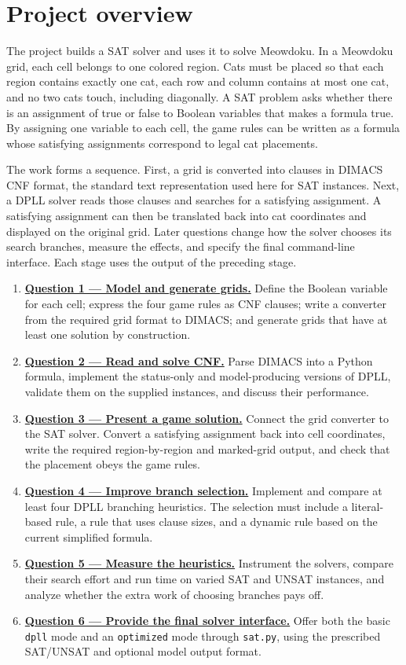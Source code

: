 \section*{Project overview}

The project builds a SAT solver and uses it to solve Meowdoku. In a Meowdoku grid, each cell belongs to one colored region. Cats must be placed so that each region contains exactly one cat, each row and column contains at most one cat, and no two cats touch, including diagonally. A SAT problem asks whether there is an assignment of true or false to Boolean variables that makes a formula true. By assigning one variable to each cell, the game rules can be written as a formula whose satisfying assignments correspond to legal cat placements.

The work forms a sequence. First, a grid is converted into clauses in DIMACS CNF format, the standard text representation used here for SAT instances. Next, a DPLL solver reads those clauses and searches for a satisfying assignment. A satisfying assignment can then be translated back into cat coordinates and displayed on the original grid. Later questions change how the solver chooses its search branches, measure the effects, and specify the final command-line interface. Each stage uses the output of the preceding stage.

\begin{enumerate}
\item \textbf{\hyperref[sec:q1]{Question 1 --- Model and generate grids.}} Define the Boolean variable for each cell; express the four game rules as CNF clauses; write a converter from the required grid format to DIMACS; and generate grids that have at least one solution by construction.
\item \textbf{\hyperref[sec:q2]{Question 2 --- Read and solve CNF.}} Parse DIMACS into a Python formula, implement the status-only and model-producing versions of DPLL, validate them on the supplied instances, and discuss their performance.
\item \textbf{\hyperref[sec:q3]{Question 3 --- Present a game solution.}} Connect the grid converter to the SAT solver. Convert a satisfying assignment back into cell coordinates, write the required region-by-region and marked-grid output, and check that the placement obeys the game rules.
\item \textbf{\hyperref[sec:q4]{Question 4 --- Improve branch selection.}} Implement and compare at least four DPLL branching heuristics. The selection must include a literal-based rule, a rule that uses clause sizes, and a dynamic rule based on the current simplified formula.
\item \textbf{\hyperref[sec:q5]{Question 5 --- Measure the heuristics.}} Instrument the solvers, compare their search effort and run time on varied SAT and UNSAT instances, and analyze whether the extra work of choosing branches pays off.
\item \textbf{\hyperref[sec:q6]{Question 6 --- Provide the final solver interface.}} Offer both the basic \texttt{dpll} mode and an \texttt{optimized} mode through \texttt{sat.py}, using the prescribed SAT/UNSAT and optional model output format.
\end{enumerate}
